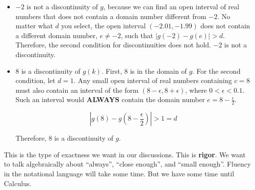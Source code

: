 \documentclass{ximera}
\begin{document}
\begin{example}
\begin{itemize}
First, $4$ is in the domain of $g$. 


For the second condition, let $d = 1$. Any small open interval of real numbers containing $c = 4$ must also contain an interval of the form $(4-\epsilon, 4+\epsilon)$, where $0 < \epsilon < 0.1$.  Such an interval would \textbf{ALWAYS} contain the domain number $e = 4-\frac{\epsilon}{2}$.

\[ \left| g(4) - g\left(4-\frac{\epsilon}{2}\right) \right| >  1 = d \]

Therefore, $4$ is a discontinuity of $g$. 


\item $-2$ is not a discontinuity of $g$, because we can find an open interval of real numbers that does not contain a domain number different from $-2$.  No matter what $d$ you select, the open interval $(-2.01, -1.99)$ does not contain a different domain number, $e \ne -2$, such that $|g(-2) - g(e)| > d$.  Therefore, the second condition for discontinuities does not hold.  $-2$ is not a discontinuity. 





\item $8$ is a discontinuity of $g(k)$.  First, $8$ is in the domain of $g$. For the second condition, let $d = 1$. Any small open interval of real numbers containing $c = 8$ must also contain an interval of the form $(8-\epsilon, 8+\epsilon)$, where $0 < \epsilon < 0.1$.   Such an interval would \textbf{ALWAYS} contain the domain number $e = 8-\frac{\epsilon}{2}$.

\[ \left| g(8) - g\left(8-\frac{\epsilon}{2}\right) \right| > 1 = d \]

Therefore, $8$ is a discontinuity of $g$.

\end{itemize}



\end{example}

This is the type of exactness we want in our discussions.  This is \textbf{\textcolor{purple!85!blue}{rigor}}. We want to talk algebraically about ``always'', ``close enough'', and ``small enough''.  Fluency in the notational language will take some time.  But we have some time until Calculus.
\end{document}
